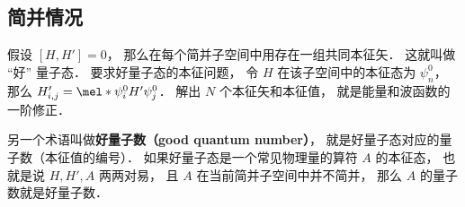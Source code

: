 \subsection{简并情况}
假设 $[H, H'] = 0$， 那么在每个简并子空间中用存在一组共同本征矢． 这就叫做 “好” 量子态． 要求好量子态的本征问题， 令 $H$ 在该子空间中的本征态为 $\psi_n^0$， 那么 $H'_{i,j} = \mel*{\psi_i^0}{H'}{\psi_j^0}$． 解出 $N$ 个本征矢和本征值， 就是能量和波函数的一阶修正．

另一个术语叫做\textbf{好量子数（good quantum number）}， 就是好量子态对应的量子数（本征值的编号）． 如果好量子态是一个常见物理量的算符 $A$ 的本征态， 也就是说 $H, H', A$ 两两对易， 且 $A$ 在当前简并子空间中并不简并， 那么 $A$ 的量子数就是好量子数．
